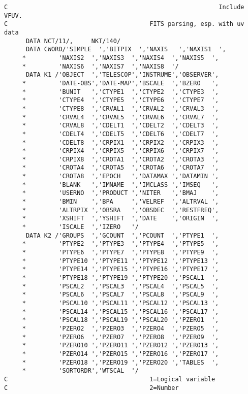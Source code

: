 \begin{verbatim}
C                                                          Include VFUV.
C                                       FITS parsing, esp. with uv data
      DATA NCT/11/,     NKT/140/
      DATA CWORD/'SIMPLE  ','BITPIX  ','NAXIS   ','NAXIS1  ',
     *         'NAXIS2  ','NAXIS3  ','NAXIS4  ','NAXIS5  ',
     *         'NAXIS6  ','NAXIS7  ','NAXIS8  '/
      DATA K1 /'OBJECT  ','TELESCOP','INSTRUME','OBSERVER',
     *         'DATE-OBS','DATE-MAP','BSCALE  ','BZERO   ',
     *         'BUNIT   ','CTYPE1  ','CTYPE2  ','CTYPE3  ',
     *         'CTYPE4  ','CTYPE5  ','CTYPE6  ','CTYPE7  ',
     *         'CTYPE8  ','CRVAL1  ','CRVAL2  ','CRVAL3  ',
     *         'CRVAL4  ','CRVAL5  ','CRVAL6  ','CRVAL7  ',
     *         'CRVAL8  ','CDELT1  ','CDELT2  ','CDELT3  ',
     *         'CDELT4  ','CDELT5  ','CDELT6  ','CDELT7  ',
     *         'CDELT8  ','CRPIX1  ','CRPIX2  ','CRPIX3  ',
     *         'CRPIX4  ','CRPIX5  ','CRPIX6  ','CRPIX7  ',
     *         'CRPIX8  ','CROTA1  ','CROTA2  ','CROTA3  ',
     *         'CROTA4  ','CROTA5  ','CROTA6  ','CROTA7  ',
     *         'CROTA8  ','EPOCH   ','DATAMAX ','DATAMIN ',
     *         'BLANK   ','IMNAME  ','IMCLASS ','IMSEQ   ',
     *         'USERNO  ','PRODUCT ','NITER   ','BMAJ    ',
     *         'BMIN    ','BPA     ','VELREF  ','ALTRVAL ',
     *         'ALTRPIX ','OBSRA   ','OBSDEC  ','RESTFREQ',
     *         'XSHIFT  ','YSHIFT  ','DATE    ','ORIGIN  ',
     *         'ISCALE  ','IZERO   '/
      DATA K2 /'GROUPS  ','GCOUNT  ','PCOUNT  ','PTYPE1  ',
     *         'PTYPE2  ','PTYPE3  ','PTYPE4  ','PTYPE5  ',
     *         'PTYPE6  ','PTYPE7  ','PTYPE8  ','PTYPE9  ',
     *         'PTYPE10 ','PTYPE11 ','PTYPE12 ','PTYPE13 ',
     *         'PTYPE14 ','PTYPE15 ','PTYPE16 ','PTYPE17 ',
     *         'PTYPE18 ','PTYPE19 ','PTYPE20 ','PSCAL1  ',
     *         'PSCAL2  ','PSCAL3  ','PSCAL4  ','PSCAL5  ',
     *         'PSCAL6  ','PSCAL7  ','PSCAL8  ','PSCAL9  ',
     *         'PSCAL10 ','PSCAL11 ','PSCAL12 ','PSCAL13 ',
     *         'PSCAL14 ','PSCAL15 ','PSCAL16 ','PSCAL17 ',
     *         'PSCAL18 ','PSCAL19 ','PSCAL20 ','PZERO1  ',
     *         'PZERO2  ','PZERO3  ','PZERO4  ','PZERO5  ',
     *         'PZERO6  ','PZERO7  ','PZERO8  ','PZERO9  ',
     *         'PZERO10 ','PZERO11 ','PZERO12 ','PZERO13 ',
     *         'PZERO14 ','PZERO15 ','PZERO16 ','PZERO17 ',
     *         'PZERO18 ','PZERO19 ','PZERO20 ','TABLES  ',
     *         'SORTORDR','WTSCAL  '/
C                                       1=Logical variable
C                                       2=Number

\end{verbatim}
